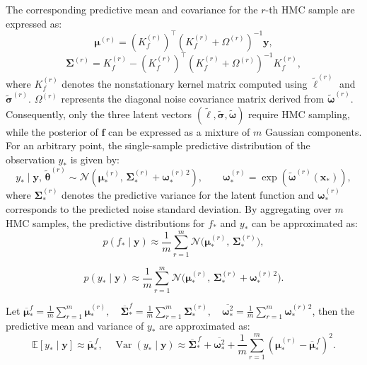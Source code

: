 \documentclass[]{interact}
\theoremstyle{plain}%
\theoremstyle{definition}
\theoremstyle{remark}
\begin{document}
The corresponding predictive mean and covariance for the $r$-th HMC sample are expressed as:
\begin{equation}
	{{\boldsymbol{\mu }}^{(r)}} = {(K_f^{(r)})^ \top }{(K_f^{(r)} + {\Omega ^{(r)}})^{ - 1}}{\mathbf{y}},
\end{equation}
\begin{equation}
	{\boldsymbol{\Sigma}^{(r)}} = K_f^{(r)} - {(K_f^{(r)})^ \top }{(K_f^{(r)} + {\Omega ^{(r)}})^{ - 1}}K_f^{(r)},
\end{equation}
where $K_{f}^{(r)}$ denotes the nonstationary kernel matrix computed using $\tilde{\boldsymbol{\ell}}^{(r)}$ and $\tilde{\boldsymbol{\sigma}}^{(r)}$. $\Omega^{(r)}$ represents the diagonal noise covariance matrix derived from $\tilde{\boldsymbol{\omega}}^{(r)}$. Consequently, only the three latent vectors $(\tilde{\boldsymbol{\ell}}, \tilde{\boldsymbol{\sigma}}, \tilde{\boldsymbol{\omega}})$ require HMC sampling, while the posterior of $\mathbf{f}$ can be expressed as a mixture of $m$ Gaussian components. For an arbitrary point, the single-sample predictive distribution of the observation $y_{*}$ is given by:
\begin{equation}
	y_*
	\mid
	\mathbf{y},\,\widetilde{\boldsymbol{\theta}}^{(r)}
	\sim
	\mathcal{N}\!\left(
	\boldsymbol{\mu}_*^{(r)},
	\,\boldsymbol{\Sigma}_*^{(r)}+\boldsymbol{\omega}_*^{(r)\,2}
	\right),
	\qquad
	\boldsymbol{\omega}_*^{(r)}
	=
	\exp\!\left(
	\widetilde{\boldsymbol{\omega}}^{(r)}(\mathbf{x}_*)
	\right),
\end{equation}
where $\boldsymbol{\Sigma}_{*}^{(r)}$ denotes the predictive variance for the latent function and $\boldsymbol{\omega}_{*}^{(r)}$ corresponds to the predicted noise standard deviation. By aggregating over $m$ HMC samples, the predictive distributions for $f_{*}$ and $y_{*}$ can be approximated as:
\begin{equation}
	p(f_*\mid \mathbf{y}) \approx \frac{1}{m}\sum_{r=1}^{m} \mathcal{N}\!\bigl(\boldsymbol{\mu}_*^{(r)},\, \boldsymbol{\Sigma}_*^{(r)}\bigr),
\end{equation}

\begin{equation}
	p(y_*\mid \mathbf{y}) \approx \frac{1}{m}\sum_{r=1}^{m} 
	\mathcal{N}\!\bigl(\boldsymbol{\mu}_*^{(r)},\, \boldsymbol{\Sigma}_*^{(r)} + \boldsymbol{\omega}_*^{(r)\,2}\bigr).
\end{equation}

Let $\overline{\boldsymbol{\mu}}_{*}^{f}
= \frac{1}{m}\sum_{r=1}^{m}\boldsymbol{\mu}_{*}^{(r)},\quad
\overline{\boldsymbol{\Sigma}}_{*}^{f}
= \frac{1}{m}\sum_{r=1}^{m}\boldsymbol{\Sigma}_{*}^{(r)},\quad
\overline{\boldsymbol{\omega}_{*}^{2}}
= \frac{1}{m}\sum_{r=1}^{m}\boldsymbol{\omega}_{*}^{(r)\,2}$, then the predictive mean and variance of $y_{*}$ are approximated as:
\begin{equation}
	\mathbb{E}\!\left[{y_*}\mid \mathbf{y}\right]
	\approx \overline{\boldsymbol{\mu}}_{*}^{\,f},\quad
	\operatorname{Var}\!\left({y_*}\mid \mathbf{y}\right)
	\approx \overline{\boldsymbol{\Sigma}}_{*}^{\,f}
	+ \overline{\boldsymbol{\omega}_{*}^{2}}
	+ \frac{1}{m}\sum_{r=1}^{m}
	\left(\boldsymbol{\mu}_{*}^{(r)} - \overline{\boldsymbol{\mu}}_{*}^{\,f}\right)^{2}.
\end{equation}
\end{document}
